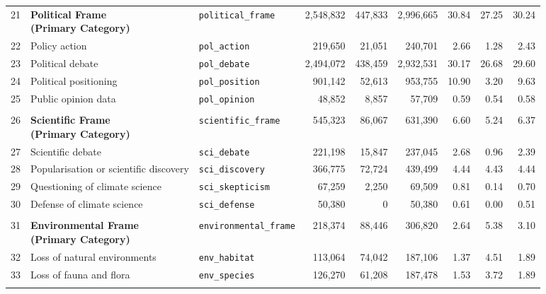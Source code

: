 \begin{longtable}{p{0.5cm}p{4.0cm}p{2.5cm}rrrrrr}
\midrule
\rowcolor{gray!8}
\multicolumn{9}{l}{\textit{Political Frame}} \\
\midrule
21 & \textbf{Political Frame\newline (Primary Category)} & \texttt{political\_frame} & 2,548,832 & 447,833 & 2,996,665 & 30.84 & 27.25 & 30.24 \\
\cmidrule(lr){1-9}
22 & Policy action & \texttt{pol\_action} & 219,650 & 21,051 & 240,701 & 2.66 & 1.28 & 2.43 \\
23 & Political debate & \texttt{pol\_debate} & 2,494,072 & 438,459 & 2,932,531 & 30.17 & 26.68 & 29.60 \\
24 & Political positioning & \texttt{pol\_position} & 901,142 & 52,613 & 953,755 & 10.90 & 3.20 & 9.63 \\
25 & Public opinion data & \texttt{pol\_opinion} & 48,852 & 8,857 & 57,709 & 0.59 & 0.54 & 0.58 \\
\midrule
\rowcolor{gray!8}
\multicolumn{9}{l}{\textit{Scientific Frame}} \\
\midrule
26 & \textbf{Scientific Frame\newline (Primary Category)} & \texttt{scientific\_frame} & 545,323 & 86,067 & 631,390 & 6.60 & 5.24 & 6.37 \\
\cmidrule(lr){1-9}
27 & Scientific debate & \texttt{sci\_debate} & 221,198 & 15,847 & 237,045 & 2.68 & 0.96 & 2.39 \\
28 & Popularisation or scientific discovery & \texttt{sci\_discovery} & 366,775 & 72,724 & 439,499 & 4.44 & 4.43 & 4.44 \\
29 & Questioning of climate science & \texttt{sci\_skepticism} & 67,259 & 2,250 & 69,509 & 0.81 & 0.14 & 0.70 \\
30 & Defense of climate science & \texttt{sci\_defense} & 50,380 & 0 & 50,380 & 0.61 & 0.00 & 0.51 \\
\midrule
\rowcolor{gray!8}
\multicolumn{9}{l}{\textit{Environmental Frame}} \\
\midrule
31 & \textbf{Environmental Frame\newline (Primary Category)} & \texttt{environmental\_frame} & 218,374 & 88,446 & 306,820 & 2.64 & 5.38 & 3.10 \\
\cmidrule(lr){1-9}
32 & Loss of natural environments & \texttt{env\_habitat} & 113,064 & 74,042 & 187,106 & 1.37 & 4.51 & 1.89 \\
33 & Loss of fauna and flora & \texttt{env\_species} & 126,270 & 61,208 & 187,478 & 1.53 & 3.72 & 1.89 \\
\midrule
\rowcolor{gray!8}
\multicolumn{9}{l}{\textit{Cultural Frame}} \\

\end{longtable}

